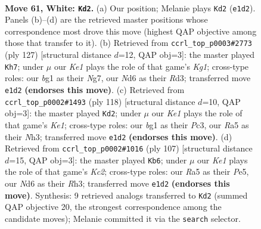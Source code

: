 \documentclass[11pt]{article}
\begin{document}
\clearpage

\begin{figure}[p]\centering
\begin{subfigure}{0.46\textwidth}\centering
\resizebox{\linewidth}{!}{%
\newchessgame
\chessboard[
  setfen={5k2/8/3Nn1P1/R7/P7/7r/8/4K1b1 w - - 3 61},
  showmover=false,
  pgfstyle=straightmove, color=movearrow, markmove={e1-d2}
]}
\caption{}
\end{subfigure}\hfill
\begin{subfigure}{0.46\textwidth}\centering
\resizebox{\linewidth}{!}{%
\newchessgame
\chessboard[
  setfen={2R3k1/6n1/8/8/P2p2N1/3r4/5K2/8 b - - 1 64},
  showmover=false,
  pgfstyle=straightmove, color=movearrow, markmove={g8-h7}
]}
\caption{}
\end{subfigure}
\\[4pt]
\begin{subfigure}{0.46\textwidth}\centering
\resizebox{\linewidth}{!}{%
\newchessgame
\chessboard[
  setfen={2r5/8/5k2/7R/4p1nP/2P3PN/8/4K3 w - - 9 60},
  showmover=false,
  pgfstyle=straightmove, color=movearrow, markmove={e1-d2}
]}
\caption{}
\end{subfigure}\hfill
\begin{subfigure}{0.46\textwidth}\centering
\resizebox{\linewidth}{!}{%
\newchessgame
\chessboard[
  setfen={8/2k5/6p1/4p3/4N3/7r/5K2/3R4 b - - 6 54},
  showmover=false,
  pgfstyle=straightmove, color=movearrow, markmove={c7-b6}
]}
\caption{}
\end{subfigure}
\caption{\textbf{Move 61, White: \texttt{Kd2}.} (a) Our position; Melanie plays \texttt{Kd2} (\texttt{e1d2}). Panels (b)--(d) are the retrieved master positions whose correspondence most drove this move (highest QAP objective among those that transfer to it). (b) Retrieved from \texttt{ccrl\_top\_p0003\#2773} (ply 127) [structural distance $d$=12, QAP obj=3]: the master played \texttt{Kh7}; under $\mu$ our \emph{Ke1} plays the role of that game's \emph{Kg1}; cross-type roles: our \emph{b}g1 as their \emph{N}g7, our \emph{N}d6 as their \emph{R}d3; transferred move \texttt{e1d2} \textbf{(endorses this move)}. (c) Retrieved from \texttt{ccrl\_top\_p0002\#1493} (ply 118) [structural distance $d$=10, QAP obj=3]: the master played \texttt{Kd2}; under $\mu$ our \emph{Ke1} plays the role of that game's \emph{Ke1}; cross-type roles: our \emph{b}g1 as their \emph{P}c3, our \emph{R}a5 as their \emph{N}h3; transferred move \texttt{e1d2} \textbf{(endorses this move)}. (d) Retrieved from \texttt{ccrl\_top\_p0002\#1016} (ply 107) [structural distance $d$=15, QAP obj=3]: the master played \texttt{Kb6}; under $\mu$ our \emph{Ke1} plays the role of that game's \emph{Kc2}; cross-type roles: our \emph{R}a5 as their \emph{P}e5, our \emph{N}d6 as their \emph{R}h3; transferred move \texttt{e1d2} \textbf{(endorses this move)}. Synthesis: 9 retrieved analogs transferred to \texttt{Kd2} (summed QAP objective 20, the strongest correspondence among the candidate moves); Melanie committed it via the \texttt{search} selector.}
\label{fig:thought-m120}
\end{figure}
\end{document}
